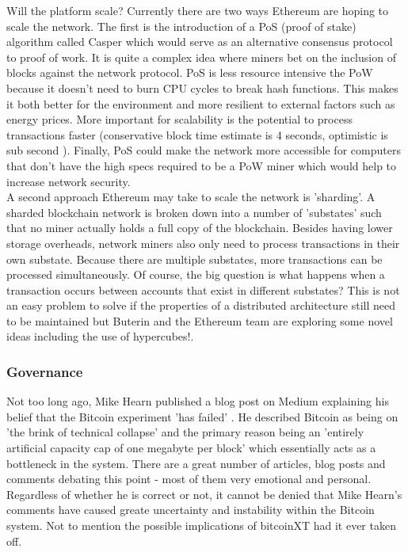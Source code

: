 Will the platform scale? Currently there are two ways Ethereum are hoping to scale the network. The first is the introduction of a PoS (proof of stake) algorithm called Casper\cite{casper} which would serve as an alternative consensus protocol to proof of work. It is quite a complex idea where miners bet on the inclusion of blocks against the network protocol. PoS is less resource intensive the PoW because it doesn't need to burn CPU cycles to break hash functions. This makes it both better for the environment and more resilient to external factors such as energy prices. More important for scalability is the potential to process transactions faster (conservative block time estimate is 4 seconds, optimistic is sub second \cite{posTPS}). Finally, PoS could make the network more accessible for computers that don't have the high specs required to be a PoW miner which would help to increase network security.\\

A second approach Ethereum may take to scale the network is 'sharding'. A sharded blockchain network is broken down into a number of 'substates' such that no miner actually holds a full copy of the blockchain. Besides having lower storage overheads, network miners also only need to process transactions in their own substate. Because there are multiple substates, more transactions can be processed simultaneously. Of course, the big question is what happens when a transaction occurs between accounts that exist in different substates? This is not an easy problem to solve if the properties of a distributed architecture still need to be maintained but Buterin and the Ethereum team are exploring some novel ideas including the use of hypercubes\cite{ButerinHypercubes}!.

\subsubsection{Governance}
Not too long ago, Mike Hearn published a blog post on Medium explaining his belief that the Bitcoin experiment 'has failed' \cite{HearnBitcoin}. He described Bitcoin as being on 'the brink of technical collapse' and the primary reason being an 'entirely artificial capacity cap of one megabyte per block' which essentially acts as a bottleneck in the system. There are a great number of articles, blog posts and comments debating this point - most of them very emotional and personal. Regardless of whether he is correct or not, it cannot be denied that Mike Hearn's comments have caused greate uncertainty and instability within the Bitcoin system. Not to mention the possible implications of bitcoinXT\cite{bitcoinXT} had it ever taken off. \\


